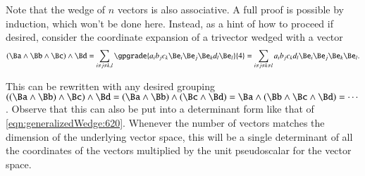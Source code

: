 Note that the wedge of \( n \) vectors is also associative.
A full proof is possible by induction, which won't be done here.
Instead, as a hint of how to proceed if desired,
consider the coordinate expansion of a trivector wedged with a vector
\begin{dmath}\label{eqn:generalizedWedge:660}
(\Ba \wedge \Bb \wedge \Bc) \wedge \Bd
=
\sum_{i \ne j \ne k, l}
\gpgrade{
a_i b_j c_k
\Be_i \Be_j \Be_k
d_l \Be_l
}{4}
=
\sum_{i \ne j \ne k \ne l}
a_i b_j c_k d_l
\Be_i \Be_j \Be_k \Be_l.
\end{dmath}

This can be rewritten with any desired grouping \( ((\Ba \wedge \Bb) \wedge \Bc) \wedge \Bd = (\Ba \wedge \Bb) \wedge ( \Bc \wedge \Bd) = \Ba \wedge (\Bb \wedge \Bc \wedge \Bd) = \cdots \).
Observe that this can also be put into a determinant form like that of
\cref{eqn:generalizedWedge:620}.
Whenever the number of vectors matches the dimension of the underlying vector space, this will be a single determinant of all the coordinates of the vectors multiplied by the unit pseudoscalar for the vector space.

